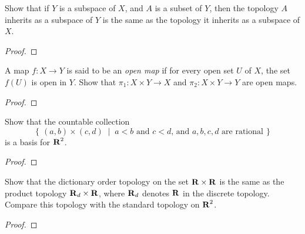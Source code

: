 \begin{problem}[Munkres, \S16, 1.]
Show that if $Y$ is a subspace of $X$, and $A$ is a subset of
$Y$, then the topology $A$ inherits as a subspace of $Y$ is the
same as the topology it inherits as a subspace of $X$.
\end{problem}
\begin{proof}
\end{proof}
\newpage

\begin{problem}[Munkres, \S16, 4.]
A map $f\colon X\to Y$ is said to be an \emph{open map} if for
every open set $U$ of $X$, the set $f(U)$ is open in $Y$. Show
that $\pi_1\colon X\times Y\to X$ and $\pi_2\colon X\times Y\to
Y$ are open maps.
\end{problem}
\begin{proof}
\end{proof}
\newpage

\begin{problem}[Munkres, \S16, 6.]
Show that the countable collection
\[
\left\{\,(a,b)\times(c,d)\;\middle|\;
\text{$a<b$ and $c<d$, and $a,b,c,d$ are rational}\,\right\}
\]
is a basis for ${\operatorname{\mathbf{R}}}^2$.
\end{problem}
\begin{proof}
\end{proof}
\newpage

\begin{problem}[Munkres, \S16, 9.]
Show that the dictionary order topology on the set
${\operatorname{\mathbf{R}}}\times{\operatorname{\mathbf{R}}}$ is the same as the product topology
${\operatorname{\mathbf{R}}}_d\times{\operatorname{\mathbf{R}}}$, where ${\operatorname{\mathbf{R}}}_d$ denotes ${\operatorname{\mathbf{R}}}$ in the
discrete topology. Compare this topology with the standard
topology on ${\operatorname{\mathbf{R}}}^2$.
\end{problem}
\begin{proof}
\end{proof}

